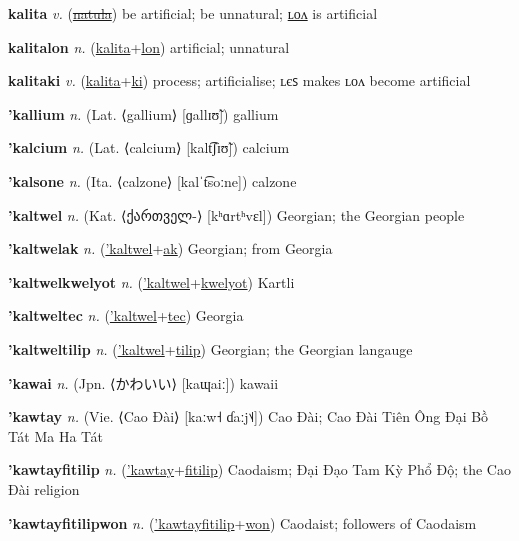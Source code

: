 \textbf{\hypertarget{kalita}{kalita}} \textit{v.} (\hyperlink{natula}{\sout{natula}})
be artificial; be unnatural; \hyperlink{kalitalon}{ʟᴏᴧ} is artificial

\textbf{\hypertarget{kalitalon}{kalitalon}} \textit{n.} (\hyperlink{kalita}{kalita}+\allowbreak \hyperlink{lon}{lon})
artificial; unnatural

\textbf{\hypertarget{kalitaki}{kalitaki}} \textit{v.} (\hyperlink{kalita}{kalita}+\allowbreak \hyperlink{ki}{ki})
process; artificialise; ʟєꜱ makes ʟᴏᴧ become artificial

\textbf{\hypertarget{'kallium}{'kallium}} \textit{n.} (Lat. ⟨gallium⟩ [ɡallɪʊ̃])
gallium

\textbf{\hypertarget{'kalcium}{'kalcium}} \textit{n.} (Lat. ⟨calcium⟩ [kalt͡ʃɪʊ̃])
calcium

\textbf{\hypertarget{'kalsone}{'kalsone}} \textit{n.} (Ita. ⟨calzone⟩ [kalˈt͡soːne])
calzone

\textbf{\hypertarget{'kaltwel}{'kaltwel}} \textit{n.} (Kat. ⟨{\georgian{}ქართველ-}⟩ [kʰɑrtʰvɛl])
Georgian; the Georgian people

\textbf{\hypertarget{'kaltwelak}{'kaltwelak}} \textit{n.} (\hyperlink{'kaltwel}{'kaltwel}+\allowbreak \hyperlink{ak}{ak})
Georgian; from Georgia

\textbf{\hypertarget{'kaltwelkwelyot}{'kaltwelkwelyot}} \textit{n.} (\hyperlink{'kaltwel}{'kaltwel}+\allowbreak \hyperlink{kwelyot}{kwelyot})
Kartli

\textbf{\hypertarget{'kaltweltec}{'kaltweltec}} \textit{n.} (\hyperlink{'kaltwel}{'kaltwel}+\allowbreak \hyperlink{tec}{tec})
Georgia

\textbf{\hypertarget{'kaltweltilip}{'kaltweltilip}} \textit{n.} (\hyperlink{'kaltwel}{'kaltwel}+\allowbreak \hyperlink{tilip}{tilip})
Georgian; the Georgian langauge

\textbf{\hypertarget{'kawai}{'kawai}} \textit{n.} (Jpn. ⟨{\japanese{}かわいい}⟩ [kaɰaiː])
kawaii

\textbf{\hypertarget{'kawtay}{'kawtay}} \textit{n.} (Vie. ⟨Cao Đài⟩ [kaːw˧ ɗaːj˦˨])
Cao Đài; Cao Đài Tiên Ông Đại Bồ Tát Ma Ha Tát

\textbf{\hypertarget{'kawtayfitilip}{'kawtayfitilip}} \textit{n.} (\hyperlink{'kawtay}{'kawtay}+\allowbreak \hyperlink{fitilip}{fitilip})
Caodaism; Đại Đạo Tam Kỳ Phổ Độ; the Cao Đài religion

\textbf{\hypertarget{'kawtayfitilipwon}{'kawtayfitilipwon}} \textit{n.} (\hyperlink{'kawtayfitilip}{'kawtayfitilip}+\allowbreak \hyperlink{won}{won})
Caodaist; followers of Caodaism

